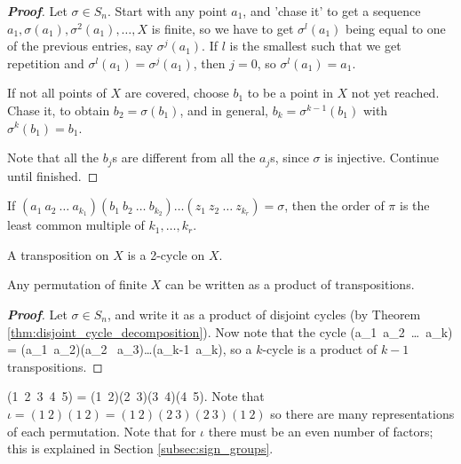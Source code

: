 \begin{proof}[\bf Proof]
Let $\sigma \in S_n$. Start with any point $a_1$, and 'chase it' to get a sequence $a_1,\sigma(a_1), \sigma^2(a_1),\dots,X$ is finite, so we have to get $\sigma^l(a_1)$ being equal to one of the previous entries, say $\sigma^j(a_1)$. If $l$ is the smallest such that we get repetition and $\sigma^l(a_1) = \sigma^j(a_1)$, then $j=0$, so $\sigma^l(a_1) =a_1$.

If not all points of $X$ are covered, choose $b_1$ to be a point in $X$ not yet reached. Chase it, to obtain $b_2 = \sigma(b_1)$, and in general, $b_k = \sigma^{k-1}(b_1)$ with $\sigma^k(b_1) = b_1$.

Note that all the $b_j$s are different from all the $a_j$s, since $\sigma$ is injective. Continue until finished.
\end{proof}

\begin{remark}
If $(a_1\ a_2\ \dots \ a_{k_1})(b_1\ b_2\ \dots \ b_{k_2}) \dots (z_1\ z_2\ \dots \ z_{k_r}) =\sigma$, then the order of $\pi$ is the least common multiple of $k_1,\dots,k_r$.
\end{remark}

\begin{definition}
A transposition on $X$ is a 2-cycle on $X$.
\end{definition}

\begin{theorem}\label{thm:permutation_product_transposition}
Any permutation of finite $X$ can be written as a product of transpositions.
\end{theorem}

\begin{proof}[\bf Proof]
Let $\sigma \in S_n$, and write it as a product of disjoint cycles (by Theorem \ref{thm:disjoint_cycle_decomposition}). Now note that the cycle
\be
(a_1\ a_2\ \dots \ a_{k}) = (a_1\ a_2)(a_2 \ a_3)\dots (a_{k-1}\ a_k),
\ee
so a $k$-cycle is a product of $k-1$ transpositions.
\end{proof}

\begin{example}
(1\ 2\ 3\ 4\ 5) = (1\ 2)(2\ 3)(3\ 4)(4\ 5). Note that $\iota = (1\ 2)(1\ 2) = (1\ 2)(2\ 3)(2\ 3)(1\ 2)$ so there are many representations of each permutation. Note that for $\iota$ there must be an even number of factors; this is explained in Section \ref{subsec:sign_groups}.
\end{example}

